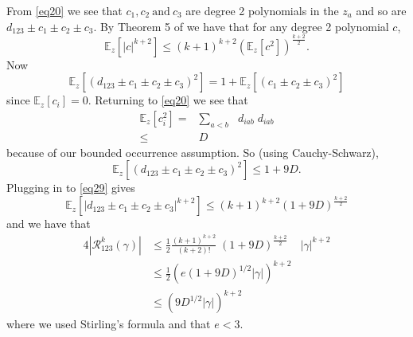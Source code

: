 \documentclass[t11pt,preprint,preprintnumbers]{revtex4}
\begin{document}
From \eqref{eq20} we see that $c_1, c_2 \ \text{and}\ c_3$ are degree 2 polynomials in the $z_a$ and so are\\ $d_{123} \pm c_1 \pm c_2 \pm c_3$. By Theorem 5 of \cite{Dinur-2007} we have that for any degree 2 polynomial $c$,
\begin{equation}\label{eq29}
\mathbb{E}_z \left[|c|^{k+2}\right] \leqslant (k+1)^{k+2} \left(\mathbb{E}_z [c^2]\right)^{\frac{k+2}{2}} .
\end{equation}
Now
\begin{equation}\label{eq30}
\mathbb{E}_z \left[(d_{123} \pm c_1 \pm c_2 \pm c_3)^2\right] = 1 + \mathbb{E}_z \left[(c_1 \pm c_2 \pm c_3)^2\right]
\end{equation}
since $\mathbb{E}_z [c_i]=0$. Returning to \eqref{eq20} we see that 
\begin{eqnarray}\label{eq31}
\mathbb{E}_z [c^2_i] = & \sum\limits_{a <b} & d_{iab}\; d_{iab}\\[.5ex]
 \leqslant & D\nonumber
\end{eqnarray}
because of our bounded occurrence assumption.  So (using Cauchy-Schwarz),
\begin{equation}\label{eq32}
\mathbb{E}_z \left[(d_{123} \pm c_1 \pm c_2 \pm c_3)^2\right] \leqslant 1 + 9 D .
\end{equation}
Plugging in to \eqref{eq29} gives
\begin{equation}\label{eq33}
\mathbb{E}_z \left[|d_{123} \pm c_1 \pm c_2 \pm c_3|^{k+2}\right] \leqslant (k+1)^{k+2} (1 + 9D)^{\frac{k+2}{2}}
\end{equation}
and we have that 
\begin{alignat}{4}\label{eq34}
\left|\mathcal{R}^k_{123} (\gamma)\right| &\leqslant \frac{1}{2} \frac{(k+1)^{k+2}}{(k+2)!}\; (1 + 9D)^{\frac{k+2}{2}} & |\gamma|^{k+2}\nonumber\\[.5ex]
& \leqslant  \frac{1}{2} \left(e(1 +9D)^{1/2} |\gamma|\right)^{k+2}&\\[.ex]
&\leqslant \left( 9 D^{1/2} |\gamma|\right)^{k+2}&\nonumber
\end{alignat}
where  we used Stirling's formula and that $e < 3$.
\end{document}
